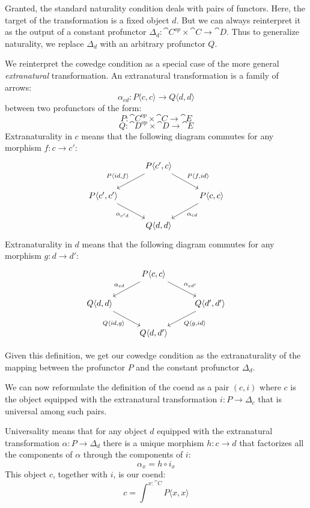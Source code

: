 \documentclass[DaoFP]{subfiles}
\begin{document}
Granted, the standard naturality condition deals with pairs of functors. Here, the target of the transformation is a fixed object $d$. But we can always reinterpret it as the output of a constant profunctor $\Delta_d \colon \cat C^{op} \times \cat C \to \cat D$. Thus to generalize naturality, we replace $\Delta_d$ with an arbitrary profunctor $Q$.

We reinterpret the cowedge condition as a special case of the more general \emph{extranatural} transformation. An extranatural transformation is a family of arrows:
\[ \alpha_{c d} \colon P \langle c, c \rangle \to Q \langle d, d \rangle \]
between two profunctors of the form:
\[ P \colon \cat C^{op} \times \cat C \to \cat E \]
\[ Q \colon \cat D^{op} \times \cat D \to \cat E \]
Extranaturality in $c$ means that the following diagram commutes for any morphism $f \colon c \to c'$:
\[
 \begin{tikzcd}
 &P \langle c', c \rangle
 \arrow[ld, "{P \langle id, f \rangle}"']
 \arrow[rd, "{P \langle f, id \rangle}"]
 \\
      P \langle c', c' \rangle
 \arrow[dr, "\alpha_{c' d}"']
 &&P \langle c, c \rangle
 \arrow[dl, "\alpha_{c d}"]
 \\
 & Q \langle d, d \rangle
 \end{tikzcd}
\]
Extranaturality in $d$ means that the following diagram commutes for any morphism $g \colon d \to d'$:
\[
 \begin{tikzcd}
 &P \langle c, c \rangle
 \arrow[ld, "\alpha_{c d}"']
 \arrow[rd, "\alpha_{c d'}"]
 \\
      Q \langle d, d \rangle
 \arrow[dr, "{Q \langle id, g\rangle}"']
 &&Q \langle d', d' \rangle
 \arrow[dl, "{Q \langle g,  id\rangle}"]
 \\
 & Q \langle d, d' \rangle
 \end{tikzcd}
\]

Given this definition, we get our cowedge condition as the extranaturality of the mapping between the profunctor $P$ and the constant profunctor $\Delta_d$. 

We can now reformulate the definition of the coend as a pair $(c, i)$ where $c$ is the object equipped with the extranatural transformation  $i \colon P \to \Delta_c$ that is universal among such pairs.

Universality means that for any object $d$ equipped with the extranatural transformation $\alpha \colon P \to \Delta_d$ there is a unique morphism $h \colon c \to d$ that factorizes all the components of $\alpha$ through the components of $i$:
\[ \alpha_x = h \circ i_x \]
This object $c$, together with $i$, is our coend:
\[ c = \int^{x \colon \cat C} P\langle x, x \rangle \]
\end{document}
